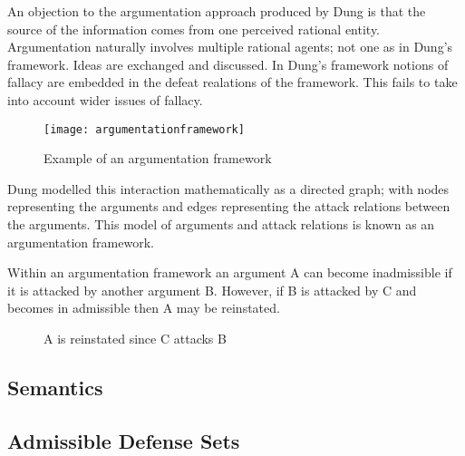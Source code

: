 An objection to the argumentation approach produced by Dung is that the source of the information comes from one perceived rational entity.
Argumentation naturally involves multiple rational agents; not one as in Dung's framework. Ideas are exchanged and discussed.
In Dung's framework notions of fallacy are embedded in the defeat realations of the framework. This fails to take into account wider issues of fallacy.


\begin{figure}[h]
\caption{Example of an argumentation framework}
\centering
\texttt{[image: argumentationframework]}
\end{figure}

Dung modelled this interaction mathematically as a directed graph; with nodes representing the arguments and edges representing the attack relations between the arguments. This model of arguments and attack relations is known as an argumentation framework.

Within an argumentation framework an argument A can become inadmissible if it is attacked by another argument B. However, if B is attacked by C and becomes in admissible then A may be reinstated.

\begin{figure}[h]
\centering
{}
\caption{A is reinstated since C attacks B}
\end{figure}


\subsection{Semantics}

\subsection{Admissible Defense Sets}

\cite{vreeswijk2006algorithm}

